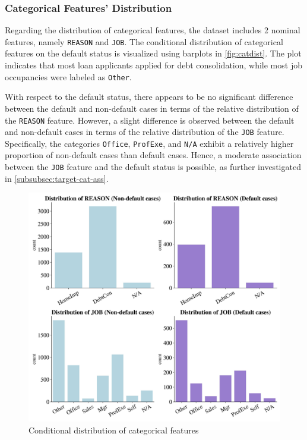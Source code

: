 \subsubsection{Categorical Features' Distribution}
\label{subsubsec:catdist}

Regarding the distribution of categorical features, the dataset includes 2 nominal features, namely \texttt{REASON} and \texttt{JOB}.
The conditional distribution of categorical features on the default status is visualized using barplots in \autoref{fig:catdist}.
The plot indicates that most loan applicants applied for debt consolidation, while most job occupancies were labeled as \texttt{Other}.

With respect to the default status, there appears to be no significant difference between the default and non-default cases in terms of the relative distribution of the \texttt{REASON} feature.
However, a slight difference is observed between the default and non-default cases in terms of the relative distribution of the \texttt{JOB} feature.
Specifically, the categories \texttt{Office}, \texttt{ProfExe}, and \texttt{N/A} exhibit a relatively higher proportion of non-default cases than default cases.
Hence, a moderate association between the \texttt{JOB} feature and the default status is possible, as further investigated in \autoref{subsubsec:target-cat-ass}.


\begin{figure}[H]
\centering
\caption{Conditional distribution of categorical features}\vspace{0.5em}
\label{fig:catdist}
\includegraphics[width=140mm]{Figures/Categorical_Features_Distribution.jpg}
\vspace{-1em}
\end{figure}

